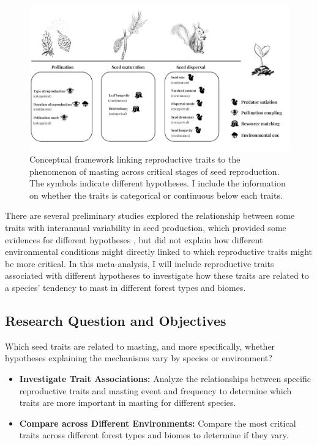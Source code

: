 \documentclass[11pt,letter]{article}
\begin{document}
\begin{figure}[htb]
	\centering
	\includegraphics[width=1\linewidth]{conceptualChap1.png}
	\caption{Conceptual framework linking reproductive traits to the phenomenon of masting across critical stages of seed reproduction. The symbols indicate different hypotheses. I include the information on whether the traits is categorical or continuous below each traits.}
	\label{fig:conceptual1}
\end{figure}
There are several preliminary studies explored the relationship between some traits with interannual variability in seed production, which provided some evidences for different hypotheses \citep{journe2023evolution, fernandez2019nutrient, pearse2020biogeography}, but did not explain how different environmental conditions might directly linked to which reproductive traits might be more critical. In this meta-analysis, I will include reproductive traits associated with different hypotheses to investigate how these traits are related to a species' tendency to mast in different forest types and biomes.\par

\subsection{Research Question and Objectives}
Which seed traits are related to masting, and more specifically, whether hypotheses explaining the mechanisms vary by species or environment?
	\begin{itemize}
	\item \textbf{Investigate Trait Associations:} Analyze the relationships between specific reproductive traits and masting event and frequency to determine which traits are more important in masting for different species.
	\item \textbf{Compare across Different Environments:} Compare the most critical traits across different forest types and biomes to determine if they vary.
	\end{itemize}
\end{document}
